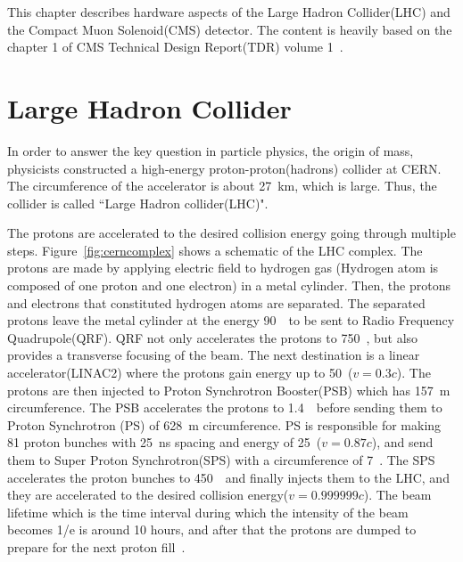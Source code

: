 This chapter describes hardware aspects of the Large Hadron Collider(LHC) 
and the Compact Muon Solenoid(CMS) detector. The content is heavily based on 
the chapter 1 of CMS Technical Design Report(TDR) volume 1~\cite{cmstdr1}.


\section{Large Hadron Collider} 


In order to answer the key question in particle physics, 
the origin of mass, physicists constructed a high-energy 
proton-proton(hadrons) collider at CERN. The circumference of the accelerator 
is about 27~km, which is large. Thus, the collider is called 
``Large Hadron collider(LHC)". 

The protons are accelerated to the desired collision energy 
going through multiple steps. 
Figure~\ref{fig:cerncomplex} shows a schematic of the LHC complex. 
The protons are made by applying electric field to hydrogen gas
(Hydrogen atom is composed of one proton and one electron) 
in a metal cylinder. Then, the protons and electrons that constituted 
hydrogen atoms are separated. The separated protons leave 
the metal cylinder at the energy 90~\keV\ to be 
sent to Radio Frequency Quadrupole(QRF). QRF not only accelerates 
the protons to 750~\keV, but also provides a transverse focusing 
of the beam. The next destination is a linear accelerator(LINAC2) 
where the protons gain energy up to 50~\MeV($v=0.3c$).
The protons are then injected to Proton Synchrotron Booster(PSB) which has 
157~m circumference. The PSB accelerates the protons to 1.4~\GeV\
before sending them to Proton Synchrotron (PS) of 628~m circumference.
PS is responsible for making 81 proton bunches with 25~ns spacing 
and energy of 25~\GeV($v=0.87c$),  
and send them to Super Proton Synchrotron(SPS) with a circumference of 7~\km. 
The SPS accelerates the proton bunches to 450~\GeV\ and finally injects them 
to the LHC, and they are accelerated to the desired collision energy($v=0.999999c$). 
The beam lifetime which is the time interval during which the intensity of 
the beam becomes 1/e is around 10 hours, and after that 
the protons are dumped to prepare for the next proton fill~\cite{LHCbeamlifetime}. 

